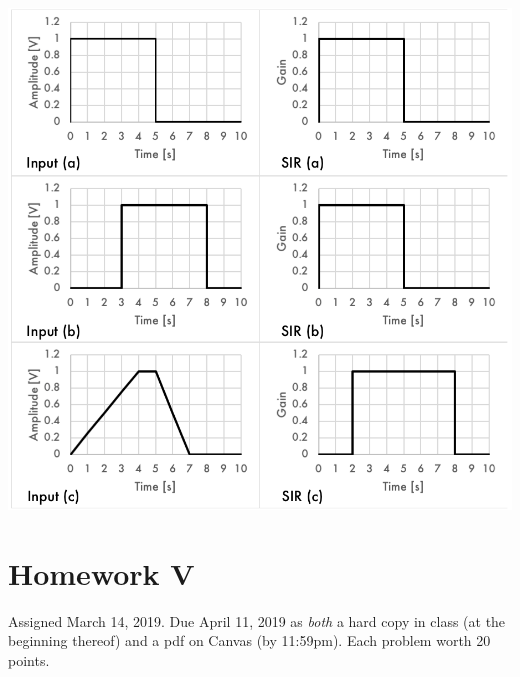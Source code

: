 \documentclass[11pt]{book}
\begin{document}
\begin{center}
	\includegraphics[width=\textwidth]{figures/hw4.01.png}
\end{center}

\chapter*{Homework V}
Assigned March 14, 2019. Due April 11, 2019 as \textit{both} a hard copy in class (at the beginning thereof) and a pdf on Canvas (by 11:59pm). Each problem worth 20 points.
\setcounter{chapter}{5}
\setcounter{section}{0}
\end{document}
